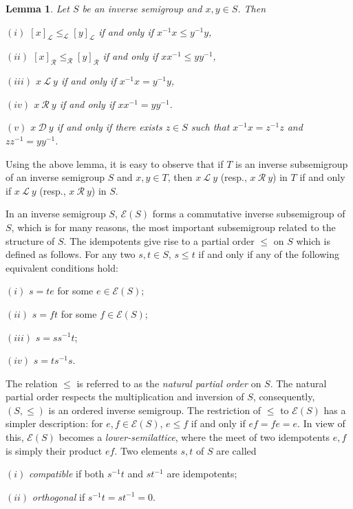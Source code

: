 \documentclass[a4paper,reqno,11pt]{amsart}
\numberwithin{equation}{section}
\newtheorem{lem}[thm]{Lemma}
\theoremstyle{definition}
\theoremstyle{remark}
\begin{document}
\begin{lem}\label{lem L and R on inverse semigroups}
Let $S$ be an inverse semigroup and $x,y\in S$. Then 

$(i)$ $[x]_{\mathscr{L}} \le_{\mathscr{L}} [y]_{\mathscr{L}}$ if and only if $x^{-1}x\le y^{-1}y$,

$(ii)$ $[x]_{\mathscr{R}} \le_{\mathscr{R}} [y]_{\mathscr{R}}$ if and only if $xx^{-1}\le yy^{-1}$,

$(iii)$ $x~\mathscr{L}~y$ if and only if $x^{-1}x=y^{-1}y$,

$(iv)$ $x~\mathscr{R}~y$ if and only if $xx^{-1}=yy^{-1}$.

$(v)$ $x~\mathscr{D}~y$ if and only if there exists $z\in S$ such that $x^{-1}x=z^{-1}z$ and $zz^{-1}=yy^{-1}$.
\end{lem}
Using the above lemma, it is easy to observe that if $T$ is an inverse subsemigroup of an inverse semigroup $S$ and $x,y\in T$, then $x~\mathscr{L}~y$ (resp., $x~\mathscr{R}~y$) in $T$ if and only if $x~\mathscr{L}~y$ (resp., $x~\mathscr{R}~y$) in $S$. 

In an inverse semigroup $S$, $\mathcal{E}(S)$ forms a commutative inverse subsemigroup of $S$, which is for many reasons, the most important subsemigroup related to the structure of $S$. The idempotents give rise to a partial order $\le$ on $S$ which is defined as follows. For any two $s,t\in S$, $s\le t$ if and only if any of the following equivalent conditions hold:

$(i)$ $s=te$ for some $e\in \mathcal{E}(S)$;

$(ii)$ $s=ft$ for some $f\in \mathcal{E}(S)$;

$(iii)$ $s=ss^{-1}t$;

$(iv)$ $s=ts^{-1}s$.

The relation $\le$ is referred to as the \emph{natural partial order} on $S$. The natural partial order respects the multiplication and inversion of $S$, consequently, $(S,\le)$ is an ordered inverse semigroup. The restriction of $\le$ to $\mathcal{E}(S)$ has a simpler description: for $e,f\in \mathcal{E}(S)$, $e\le f$ if and only if $ef=fe=e$. In view of this, $\mathcal{E}(S)$ becomes a \emph{lower-semilattice}, where the meet of two idempotents $e,f$ is simply their product $ef$. Two elements $s,t$ of $S$ are called 

$(i)$ \emph{compatible} if both $s^{-1}t$ and $st^{-1}$ are idempotents;

$(ii)$ \emph{orthogonal} if $s^{-1}t=st^{-1}=0$. 
\end{document}
